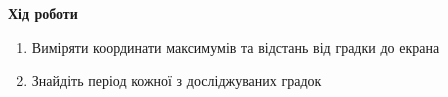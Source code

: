 \begin{center}
    \Large{\textbf{Хід роботи}}    
\end{center}

\vspace{1mm}


\begin{enumerate}
    \item Виміряти координати максимумів та відстань від градки до екрана
    \item Знайдіть період кожної з досліджуваних градок
\end{enumerate}